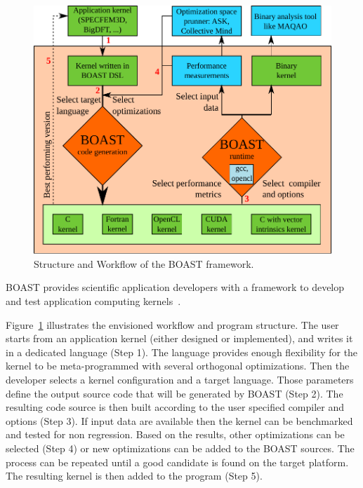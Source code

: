\documentclass{IEEEtran}
\begin{document}
\begin{figure}
\begin{center}
\includegraphics[width=\columnwidth]{BOAST_Workflow.pdf}
\caption{Structure and Workflow of the BOAST framework.}
\label{fig:boast_workflow}
\end{center}
\end{figure}

BOAST provides scientific application developers with a framework to develop and
test application computing kernels~\cite{videau2013boast}.

Figure~\ref{fig:boast_workflow} illustrates the envisioned workflow and program
structure. The user starts from an application kernel (either designed or
implemented), and writes it in a dedicated language (Step 1). The language
provides enough flexibility for the kernel to be meta-programmed with several
orthogonal optimizations. Then the developer selects a kernel configuration and
a target language. Those parameters define the output source code that will be
generated by BOAST (Step 2). The resulting code source is then built according
to the user specified compiler and options (Step 3). If input data are available
then the kernel can be benchmarked and tested for non regression. Based on the
results, other optimizations can be selected (Step 4) or new optimizations can
be added to the BOAST sources. The process can be repeated until a good
candidate is found on the target platform. The resulting kernel is then added to
the program (Step 5).
\end{document}
